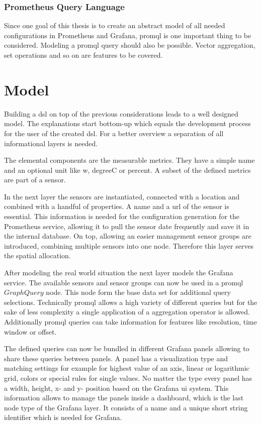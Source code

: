 \subsubsection{Prometheus Query Language}
Since one goal of this thesis is to create an abstract model of all needed configurations in Prometheus and Grafana, \gls{promql} is one important thing to be considered. Modeling a \gls{promql} query should also be possible. Vector aggregation, set operations and so on are features to be covered. 


\section{Model}

Building a \gls{dsl} on top of the previous considerations leads to a well designed model. The explanations start bottom-up which equals the development process for the user of the created \gls{dsl}. For a better overview a separation of all informational layers is needed.

The elemental components are the measurable metrics. They have a simple name and an optional unit like \gls{w}, \gls{degreeC} or \gls{percent}. A subset of the defined metrics are part of a sensor.

In the next layer the sensors are instantiated, connected with a location and combined with a handful of properties. A name and a \gls{url} of the sensor is essential. This information is needed for the configuration generation for the Prometheus service, allowing it to pull the sensor date frequently and save it in the internal database. On top, allowing an easier management sensor groups are introduced, combining multiple sensors into one node. Therefore this layer serves the spatial allocation. 

After modeling the real world situation the next layer models the Grafana service. The available sensors and sensor groups can now be used in a \gls{promql} $GraphQuery$ node. This node form the base data set for additional query selections. Technically \gls{promql} allows a high variety of different queries but for the sake of less complexity a single application of a aggregation operator is allowed. Additionally \gls{promql} queries can take information for features like resolution, time window or offset. 

The defined queries can now be bundled in different Grafana panels allowing to share these queries between panels. A panel has a visualization type and matching settings for example for highest value of an axis, linear or logarithmic grid, colors or special rules for single values. No matter the type every panel has a width, height, x- and y- position based on the Grafana \gls{ui} system. This information allows to manage the panels inside a dashboard, which is the last node type of the Grafana layer. It consists of a name and a unique short string identifier which is needed for Grafana. 

